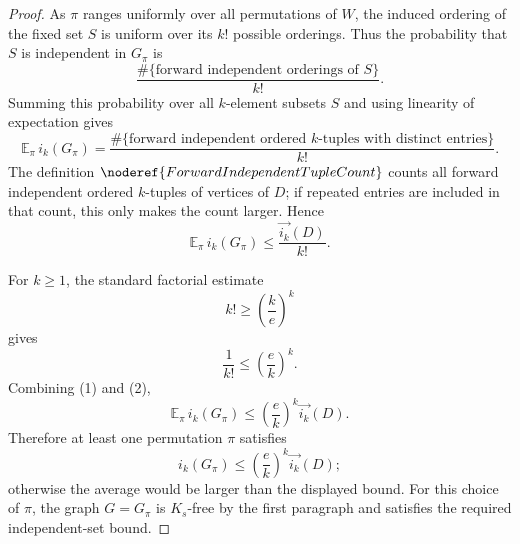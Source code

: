 \begin{proof}
As \(\pi\) ranges uniformly over all permutations of \(W\), the induced ordering of the fixed set \(S\) is uniform over its \(k!\) possible orderings. Thus the probability that \(S\) is independent in \(G_\pi\) is
\[
  \frac{\#\{\text{forward independent orderings of }S\}}{k!}.
\]
Summing this probability over all \(k\)-element subsets \(S\) and using linearity of expectation gives
\[
  \mathbb E_\pi\, i_k(G_\pi)
  =
  \frac{\#\{\text{forward independent ordered \(k\)-tuples with distinct entries}\}}{k!}.
\]
The definition \(\noderef{ForwardIndependentTupleCount}\) counts all forward independent ordered \(k\)-tuples of vertices of \(D\); if repeated entries are included in that count, this only makes the count larger. Hence
\[
  \mathbb E_\pi\, i_k(G_\pi)
  \le
  \frac{\overrightarrow{i_k}(D)}{k!}. \tag{1}
\]

For \(k\ge1\), the standard factorial estimate
\[
  k!\ge \left(\frac{k}{e}\right)^k
\]
gives
\[
  \frac{1}{k!}\le \left(\frac e k\right)^k. \tag{2}
\]
Combining (1) and (2),
\[
  \mathbb E_\pi\, i_k(G_\pi)
  \le
  \left(\frac e k\right)^k\overrightarrow{i_k}(D).
\]
Therefore at least one permutation \(\pi\) satisfies
\[
  i_k(G_\pi)\le
  \left(\frac e k\right)^k\overrightarrow{i_k}(D);
\]
otherwise the average would be larger than the displayed bound. For this choice of \(\pi\), the graph \(G=G_\pi\) is \(K_s\)-free by the first paragraph and satisfies the required independent-set bound.
\end{proof}
